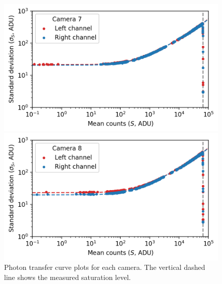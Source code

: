 \begin{colsection}
\begin{figure}[p]
\begin{center}
        \begin{minipage}[t]{0.49\linewidth}\vspace{10pt}
            \includegraphics[width=\linewidth]{images/detectors/ptc_7.png}
        \end{minipage}
        \begin{minipage}[t]{0.49\linewidth}\vspace{10pt}
            \includegraphics[width=\linewidth]{images/detectors/ptc_8.png}
        \end{minipage}
    \end{center}
    \caption[Photon transfer curve plots]{
        Photon transfer curve plots for each camera. The vertical dashed line shows the measured saturation level.
    }\label{fig:ptcs}
\end{figure}

\clearpage
\newpage

\end{colsection}


